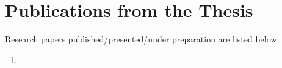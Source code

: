 \chapter*{Publications from the Thesis}
Research papers published/presented/under preparation are listed below
\begin{enumerate}
\item   
\end{enumerate}